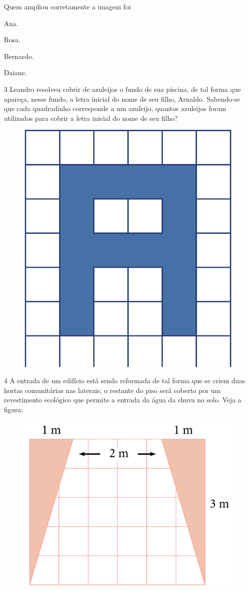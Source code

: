 Quem ampliou corretamente a imagem foi

\begin{minipage}{.5\textwidth}
\begin{escolha}
\item
  Ana.
\item
  Rosa.
\item
  Bernardo.
\item
  Daiane.
\end{escolha}
\end{minipage}

\pagebreak
\num{3} Leandro resolveu cobrir de azuleijos o fundo de sua piscina, de tal
forma que apareça, nesse fundo, a letra inicial do nome de seu filho,
Arnaldo. Sabendo-se que cada quadradinho corresponde a um azuleijo,
quantos azuleijos foram utilizados para cobrir a letra inicial do nome
de seu filho?

\begin{figure}[htpb!]
\centering
\includegraphics[width=.35\textwidth]{../ilustracoes/MAT5/SAEB_5ANO_MAT_figura37.png}
\end{figure}



\num{4} A entrada de um edifício está sendo reformada de tal forma que se
criem duas hortas comunitárias nas laterais; o restante do piso será coberto por um revestimento ecológico que permite a entrada da água da chuva no solo. Veja
a figura:

\begin{figure}[htpb!]
\centering
\includegraphics[width=.45\textwidth]{../ilustracoes/MAT5/SAEB_5ANO_MAT_figura38.png}
\end{figure}

